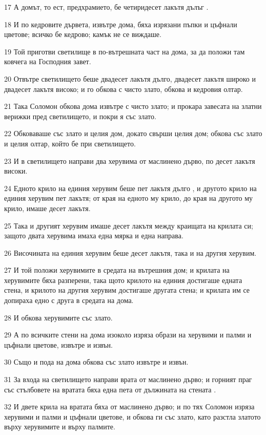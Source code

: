 \par 17 А домът, то ест, предхрамието, бе четиридесет лакътя дълъг .
\par 18 И по кедровите дървета, извътре дома, бяха изрязани пъпки и цъфнали цветове; всичко бе кедрово; камък не се виждаше.
\par 19 Той приготви светилище в по-вътрешната част на дома, за да положи там ковчега на Господния завет.
\par 20 Отвътре светилището беше двадесет лакътя дълго, двадесет лакътя широко и двадесет лакътя високо; и го обкова с чисто злато, обкова и кедровия олтар.
\par 21 Така Соломон обкова дома извътре с чисто злато; и прокара завесата на златни верижки пред светилището, и покри я със злато.
\par 22 Обковаваше със злато и целия дом, докато свърши целия дом; обкова със злато и целия олтар, който бе при светилището.
\par 23 И в светилището направи два херувима от маслинено дърво, по десет лакътя високи.
\par 24 Едното крило на единия херувим беше пет лакътя дълго , и другото крило на единия херувим пет лакътя; от края на едното му крило, до края на другото му крило, имаше десет лакътя.
\par 25 Така и другият херувим имаше десет лакътя между краищата на крилата си; защото двата херувима имаха една мярка и една направа.
\par 26 Височината на единия херувим беше десет лакътя, така и на другия херувим.
\par 27 И той положи херувимите в средата на вътрешния дом; и крилата на херувимите бяха разперени, така щото крилото на единия достигаше едната стена, и крилото на другия херувим достигаше другата стена; и крилата им се допираха едно с друга в средата на дома.
\par 28 И обкова херувимите със злато.
\par 29 А по всичките стени на дома изоколо изряза образи на херувими и палми и цъфнали цветове, извътре и извън.
\par 30 Също и пода на дома обкова със злато извътре и извън.
\par 31 За входа на светилището направи врата от маслинено дърво; и горният праг със стълбовете на вратата бяха една пета от дължината на стената .
\par 32 И двете крила на вратата бяха от маслинено дърво; и по тях Соломон изряза херувими и палми и цъфнали цветове, и обкова ги със злато, като разстла златото върху херувимите и върху палмите.
